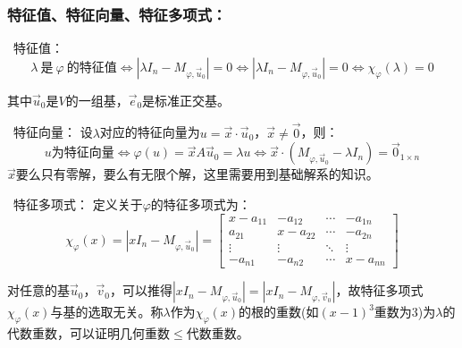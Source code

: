 \documentclass[zihao=-4,UTF8]{report}
\theoremstyle{mystyle} %
\begin{document}
\subsubsection{特征值、特征向量、特征多项式：}
\ 特征值：
\begin{equation*}
    \lambda\ \text{是}\ \varphi\ \text{的特征值} \Longleftrightarrow   \left |  \lambda I_n -M_{\varphi,\vec{u}_0} \right | = 0\Longleftrightarrow\left |  \lambda I_n -M_{\varphi,\vec{u}_0} \right |  = 0 \Longleftrightarrow \chi_{\varphi}(\lambda) = 0
\end{equation*}\par
{\color{gray}\small 其中$\vec{u}_0$是$V$的一组基，$\vec{e}_0$是标准正交基。}\par
{}\ 特征向量：
设$\lambda$对应的特征向量为$u = \vec{x}\cdot \vec{u}_0$，$ \vec{x} \ne \vec{0}$，则：
\begin{equation*}
   u \text{为特征向量} \Longleftrightarrow \varphi(u) = \vec{x}A\vec{u}_0 = \lambda u \Longleftrightarrow \vec{x}\cdot ( M_{\varphi,\vec{u}_0}- \lambda I_n )  = \vec{0}_{1\times n}
\end{equation*}
{\color{gray}\small $\vec{x}$要么只有零解，要么有无限个解，这里需要用到基础解系的知识。}\par
{}\ 特征多项式：
定义关于$\varphi$的特征多项式为：
\begin{equation*}
    \chi_{\varphi}(x) = \left |x I_n  - M_{\varphi,\vec{u}_0}\right | = \begin{bmatrix}  
        x -a_{11}& -a_{12}& \cdots  & -a_{1n} \\  
        a_{21}& x -a_{22}& \cdots  & -a_{2n} \\  
        \vdots & \vdots & \ddots & \vdots \\  
        -a_{n1}& -a_{n2}& \cdots  & x-a_{nn}  
      \end{bmatrix}  
\end{equation*}\par
对任意的基$\vec{u}_0$，$\vec{v}_0$，可以推得$\left |x I_n  - M_{\varphi,\vec{u}_0}\right | = \left |x I_n  - M_{\varphi,\vec{v}_0}\right |$，故特征多项式$\chi_{\varphi}(x)$与基的选取无关。称$\lambda$作为$\chi_{\varphi}(x)$的根的重数(如$(x-1)^3$重数为3)为$\lambda$的代数重数，可以证明几何重数$\le$代数重数。
\end{document}
